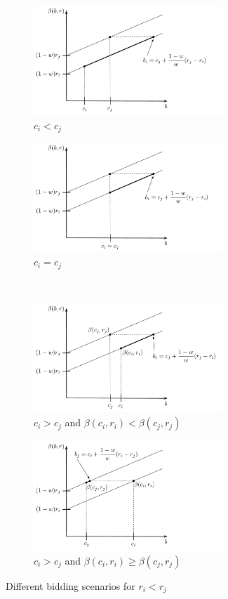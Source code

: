 \begin{figure}[p!]
	\vspace{0.5cm}
	\begin{subfigure}[b]{0.5\textwidth}
	  \includegraphics[width=2.8in]{Direct/Figures/complete_N_2_c1}
	  \caption{$c_i < c_j$}
	  \label{fig:complete_N_2_c1_direct}
	\end{subfigure}
	\begin{subfigure}[b]{0.5\textwidth}
	  \includegraphics[width=2.8in]{Direct/Figures/complete_N_2_c2}
	  \caption{$c_i = c_j$}
	  \label{fig:complete_N_2_c2_direct}
	\end{subfigure}
	\vspace{0.5cm}\\
	\begin{subfigure}[b]{0.5\textwidth}
	  \includegraphics[width=2.8in]{Direct/Figures/complete_N_2_c3_1}
	  \caption{$c_i > c_j$ and $\beta(c_i,r_i) < \beta(c_j,r_j)$}
	  \label{fig:complete_N_2_c3_1_direct}
	\end{subfigure}
	\begin{subfigure}[b]{0.5\textwidth}
	  \includegraphics[width=2.8in]{Direct/Figures/complete_N_2_c3_2}
	  \caption{$c_i > c_j$ and $\beta(c_i,r_i) \ge \beta(c_j,r_j)$}
	  \label{fig:complete_N_2_c3_2_direct}
	\end{subfigure}
	\caption{Different bidding scenarios for $r_i < r_j$}
	\label{fig:complete_N_2_1_direct}
\end{figure}

